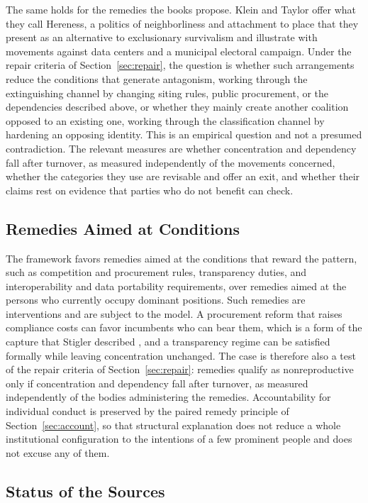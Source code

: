 \documentclass[12pt]{article}
\theoremstyle{remark}
\begin{document}
The same holds for the remedies the books propose. Klein and Taylor offer what they call Hereness, a politics of neighborliness and attachment to place that they present as an alternative to exclusionary survivalism and illustrate with movements against data centers and a municipal electoral campaign. Under the repair criteria of Section~\ref{sec:repair}, the question is whether such arrangements reduce the conditions that generate antagonism, working through the extinguishing channel by changing siting rules, public procurement, or the dependencies described above, or whether they mainly create another coalition opposed to an existing one, working through the classification channel by hardening an opposing identity. This is an empirical question and not a presumed contradiction. The relevant measures are whether concentration and dependency fall after turnover, as measured independently of the movements concerned, whether the categories they use are revisable and offer an exit, and whether their claims rest on evidence that parties who do not benefit can check.

\subsection{Remedies Aimed at Conditions}

The framework favors remedies aimed at the conditions that reward the pattern, such as competition and procurement rules, transparency duties, and interoperability and data portability requirements, over remedies aimed at the persons who currently occupy dominant positions. Such remedies are interventions and are subject to the model. A procurement reform that raises compliance costs can favor incumbents who can bear them, which is a form of the capture that Stigler described \cite{stigler1971}, and a transparency regime can be satisfied formally while leaving concentration unchanged. The case is therefore also a test of the repair criteria of Section~\ref{sec:repair}: remedies qualify as nonreproductive only if concentration and dependency fall after turnover, as measured independently of the bodies administering the remedies. Accountability for individual conduct is preserved by the paired remedy principle of Section~\ref{sec:account}, so that structural explanation does not reduce a whole institutional configuration to the intentions of a few prominent people and does not excuse any of them.

\subsection{Status of the Sources}
\end{document}
